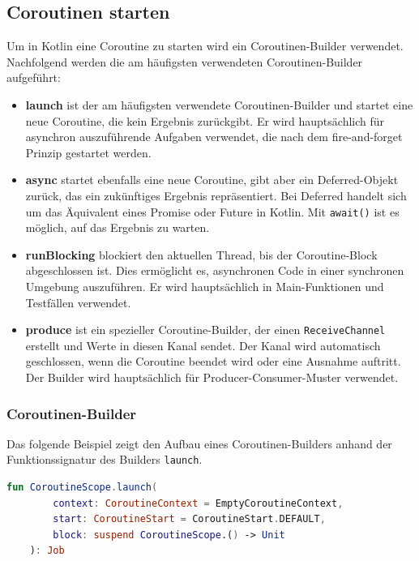 \documentclass[fontsize=12pt,paper=a4,twoside=semi,parskip=half-,headsepline,headinclude]{scrreprt}
\begin{document}
\subsection{Coroutinen starten}
\label{subsec:corostarten}

Um in Kotlin eine Coroutine zu starten wird ein Coroutinen-Builder verwendet. Nachfolgend werden  die am häufigsten verwendeten Coroutinen-Builder aufgeführt:

\begin{itemize}
	\item \textbf{launch} ist der am häufigsten verwendete Coroutinen-Builder und startet eine neue Coroutine, die kein Ergebnis zurückgibt. Er wird hauptsächlich für asynchron auszuführende Aufgaben verwendet, die nach dem fire-and-forget Prinzip gestartet werden.
	\item \textbf{async} startet ebenfalls eine neue Coroutine, gibt aber ein Deferred-Objekt zurück, das ein zukünftiges Ergebnis repräsentiert. Bei Deferred handelt sich um das Äquivalent eines Promise oder Future in Kotlin. Mit \texttt{await()} ist es möglich, auf das Ergebnis zu warten.
	\item \textbf{runBlocking} blockiert den aktuellen Thread, bis der Coroutine-Block abgeschlossen ist. Dies ermöglicht es, asynchronen Code in einer synchronen Umgebung auszuführen. Er wird hauptsächlich in Main-Funktionen und Testfällen verwendet.
	\item \textbf{produce} ist ein spezieller Coroutine-Builder, der einen \texttt{ReceiveChannel} erstellt und Werte in diesen Kanal sendet. Der Kanal wird automatisch geschlossen, wenn die Coroutine beendet wird oder eine Ausnahme auftritt. Der Builder wird haupt\-säch\-lich für Producer-Consumer-Muster verwendet.
\end{itemize}


\subsubsection{Coroutinen-Builder}

Das folgende Beispiel zeigt den Aufbau eines Coroutinen-Builders anhand der Funktionssignatur des Builders \texttt{launch}.

\begin{lstlisting}[language=Kotlin]
	fun CoroutineScope.launch(
		context: CoroutineContext = EmptyCoroutineContext,
		start: CoroutineStart = CoroutineStart.DEFAULT,
		block: suspend CoroutineScope.() -> Unit
	): Job
\end{lstlisting}
\end{document}
